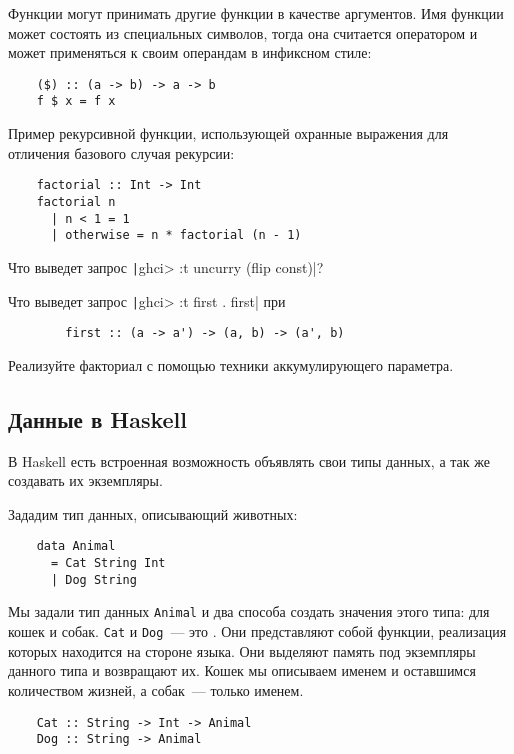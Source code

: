 Функции могут принимать другие функции в качестве аргументов.
Имя функции может состоять из специальных символов, тогда она считается оператором и может применяться к своим операндам в инфиксном стиле:
\begin{verbatim}
    ($) :: (a -> b) -> a -> b
    f $ x = f x
\end{verbatim}

Пример рекурсивной функции, использующей охранные выражения для отличения базового случая рекурсии:
\begin{verbatim}
    factorial :: Int -> Int
    factorial n
      | n < 1 = 1
      | otherwise = n * factorial (n - 1)
\end{verbatim}

\begin{task}
    Что выведет запрос \texttt|ghci> :t uncurry (flip const)|?
\end{task}

\begin{task}
    Что выведет запрос \texttt|ghci> :t first . first| при
    \begin{verbatim}
        first :: (a -> a') -> (a, b) -> (a', b)
    \end{verbatim}
\end{task}

\begin{task}
    Реализуйте факториал с помощью техники аккумулирующего параметра.
\end{task}

\subsection{Данные в Haskell}

В Haskell есть встроенная возможность объявлять свои типы данных, а так же создавать их экземпляры.

Зададим тип данных, описывающий животных:
\begin{verbatim}
    data Animal
      = Cat String Int
      | Dog String
\end{verbatim}

Мы задали тип данных \texttt{Animal} и два способа создать значения этого типа: для кошек и собак.
\texttt{Cat} и \texttt{Dog}~--- это .
Они представляют собой функции, реализация которых находится на стороне языка.
Они выделяют память под экземпляры данного типа и возвращают их.
Кошек мы описываем именем и оставшимся количеством жизней, а собак~--- только именем.
\begin{verbatim}
    Cat :: String -> Int -> Animal
    Dog :: String -> Animal
\end{verbatim}

